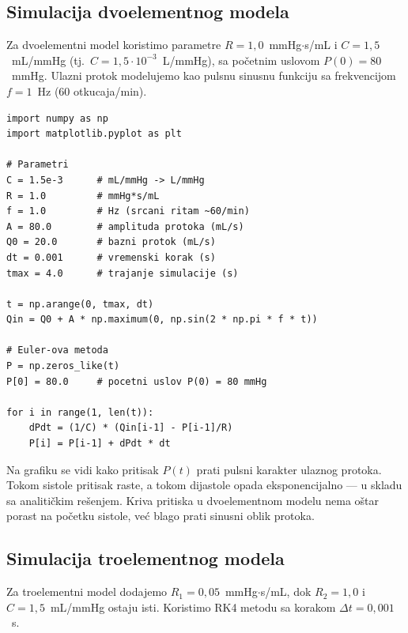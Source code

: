\documentclass[12pt,a4paper]{article}
\begin{document}
\subsection{Simulacija dvoelementnog modela}

Za dvoelementni model koristimo parametre $R = 1{,}0$~mmHg$\cdot$s/mL i $C = 1{,}5$~mL/mmHg (tj.\ $C = 1{,}5 \cdot 10^{-3}$~L/mmHg), sa početnim uslovom $P(0) = 80$~mmHg. Ulazni protok modelujemo kao pulsnu sinusnu funkciju sa frekvencijom $f = 1$~Hz (60 otkucaja/min).

\begin{lstlisting}[caption={Simulacija dvoelementnog Windkessel modela (Euler-ova metoda)}]
import numpy as np
import matplotlib.pyplot as plt

# Parametri
C = 1.5e-3      # mL/mmHg -> L/mmHg
R = 1.0         # mmHg*s/mL
f = 1.0         # Hz (srcani ritam ~60/min)
A = 80.0        # amplituda protoka (mL/s)
Q0 = 20.0       # bazni protok (mL/s)
dt = 0.001      # vremenski korak (s)
tmax = 4.0      # trajanje simulacije (s)

t = np.arange(0, tmax, dt)
Qin = Q0 + A * np.maximum(0, np.sin(2 * np.pi * f * t))

# Euler-ova metoda
P = np.zeros_like(t)
P[0] = 80.0     # pocetni uslov P(0) = 80 mmHg

for i in range(1, len(t)):
    dPdt = (1/C) * (Qin[i-1] - P[i-1]/R)
    P[i] = P[i-1] + dPdt * dt
\end{lstlisting}


Na grafiku se vidi kako pritisak $P(t)$ prati pulsni karakter ulaznog protoka. Tokom sistole pritisak raste, a tokom dijastole opada eksponencijalno --- u skladu sa analitičkim rešenjem. Kriva pritiska u dvoelementnom modelu nema oštar porast na početku sistole, već blago prati sinusni oblik protoka.


\subsection{Simulacija troelementnog modela}

Za troelementni model dodajemo $R_1 = 0{,}05$~mmHg$\cdot$s/mL, dok $R_2 = 1{,}0$ i $C = 1{,}5$~mL/mmHg ostaju isti. Koristimo RK4 metodu sa korakom $\Delta t = 0{,}001$~s.
\end{document}
